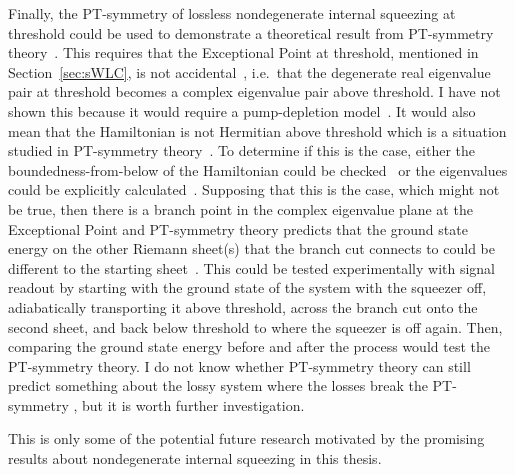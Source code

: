 Finally, the PT-symmetry of lossless nondegenerate internal squeezing at threshold could be used to demonstrate a theoretical result from PT-symmetry theory~\cite{CMBpersonalCommunication}. This requires that the Exceptional Point at threshold, mentioned in Section~\ref{sec:sWLC}, is not accidental~\cite{}, i.e.\ that the degenerate real eigenvalue pair at threshold becomes a complex eigenvalue pair above threshold. I have not shown this because it would require a pump-depletion model~\cite{}. It would also mean that the Hamiltonian is not Hermitian above threshold which is a situation studied in PT-symmetry theory~\cite{}. To determine if this is the case, either the boundedness-from-below of the Hamiltonian could be checked~\cite{} or the eigenvalues could be explicitly calculated~\cite{}. Supposing that this is the case, which might not be true, then there is a branch point in the complex eigenvalue plane at the Exceptional Point and PT-symmetry theory predicts that the ground state energy on the other Riemann sheet(s) that the branch cut connects to could be different to the starting sheet~\cite{}. This could be tested experimentally with signal readout by starting with the ground state of the system with the squeezer off, adiabatically transporting it above threshold, across the branch cut onto the second sheet, and back below threshold to where the squeezer is off again. Then, comparing the ground state energy before and after the process would test the PT-symmetry theory. I do not know whether PT-symmetry theory can still predict something about the lossy system where the losses break the PT-symmetry , but it is worth further investigation.

This is only some of the potential future research motivated by the promising results about nondegenerate internal squeezing in this thesis.

